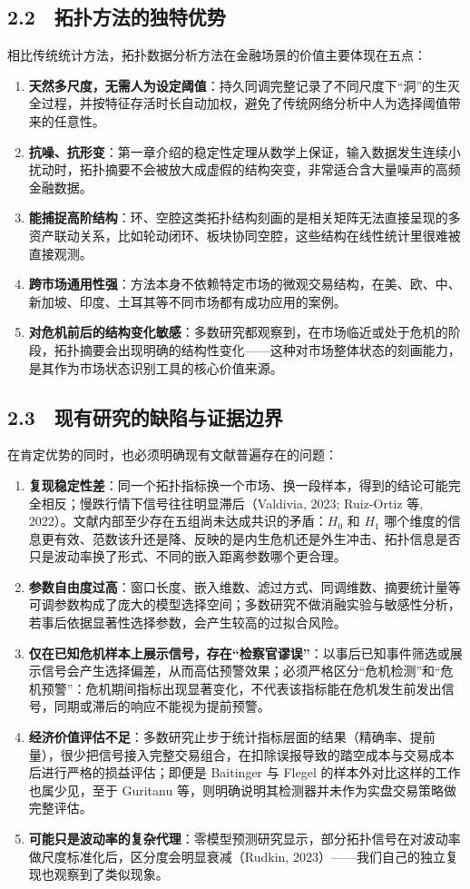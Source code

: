 \documentclass[12pt,a4paper]{ctexart}
\begin{document}
\subsection{2.2　拓扑方法的独特优势}
相比传统统计方法，拓扑数据分析方法在金融场景的价值主要体现在五点：\par
\begin{enumerate}
\item \textbf{天然多尺度，无需人为设定阈值}：持久同调完整记录了不同尺度下“洞”的生灭全过程，并按特征存活时长自动加权，避免了传统网络分析中人为选择阈值带来的任意性。
\item \textbf{抗噪、抗形变}：第一章介绍的稳定性定理从数学上保证，输入数据发生连续小扰动时，拓扑摘要不会被放大成虚假的结构突变，非常适合含大量噪声的高频金融数据。
\item \textbf{能捕捉高阶结构}：环、空腔这类拓扑结构刻画的是相关矩阵无法直接呈现的多资产联动关系，比如轮动闭环、板块协同空腔，这些结构在线性统计里很难被直接观测。
\item \textbf{跨市场通用性强}：方法本身不依赖特定市场的微观交易结构，在美、欧、中、新加坡、印度、土耳其等不同市场都有成功应用的案例。
\item \textbf{对危机前后的结构变化敏感}：多数研究都观察到，在市场临近或处于危机的阶段，拓扑摘要会出现明确的结构性变化——这种对市场整体状态的刻画能力，是其作为市场状态识别工具的核心价值来源。
\end{enumerate}
\subsection{2.3　现有研究的缺陷与证据边界}
在肯定优势的同时，也必须明确现有文献普遍存在的问题：\par
\begin{enumerate}
\item \textbf{复现稳定性差}：同一个拓扑指标换一个市场、换一段样本，得到的结论可能完全相反；慢跌行情下信号往往明显滞后（Valdivia, 2023; Ruiz-Ortiz 等, 2022）。文献内部至少存在五组尚未达成共识的矛盾：\(H_0\) 和 \(H_1\) 哪个维度的信息更有效、范数该升还是降、反映的是内生危机还是外生冲击、拓扑信息是否只是波动率换了形式、不同的嵌入距离参数哪个更合理。
\item \textbf{参数自由度过高}：窗口长度、嵌入维数、滤过方式、同调维数、摘要统计量等可调参数构成了庞大的模型选择空间；多数研究不做消融实验与敏感性分析，若事后依据显著性选择参数，会产生较高的过拟合风险。
\item \textbf{仅在已知危机样本上展示信号，存在“检察官谬误”}：以事后已知事件筛选或展示信号会产生选择偏差，从而高估预警效果；必须严格区分“危机检测”和“危机预警”：危机期间指标出现显著变化，不代表该指标能在危机发生前发出信号，同期或滞后的响应不能视为提前预警。
\item \textbf{经济价值评估不足}：多数研究止步于统计指标层面的结果（精确率、提前量），很少把信号接入完整交易组合，在扣除误报导致的踏空成本与交易成本后进行严格的损益评估；即便是 Baitinger 与 Flegel 的样本外对比这样的工作也属少见，至于 Guritanu 等，则明确说明其检测器并未作为实盘交易策略做完整评估。
\item \textbf{可能只是波动率的复杂代理}：零模型预测研究显示，部分拓扑信号在对波动率做尺度标准化后，区分度会明显衰减（Rudkin, 2023）——我们自己的独立复现也观察到了类似现象。
\end{enumerate}
\end{document}
